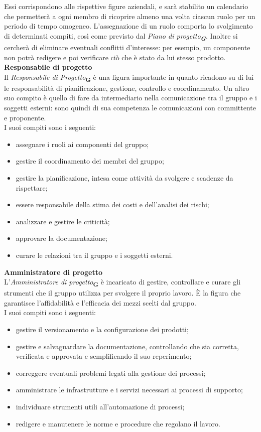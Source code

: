 Essi corrispondono alle rispettive figure aziendali, e sarà stabilito un calendario che permetterà a ogni membro di ricoprire almeno una volta ciascun ruolo per un periodo di tempo omogeneo. L'assegnazione di un ruolo comporta lo svolgimento di determinati compiti, così come previsto dal \textit{Piano di progetto\textsubscript{\textbf{G}}}. Inoltre si cercherà di eliminare eventuali conflitti d'interesse: per esempio, un componente non potrà redigere e poi verificare ciò che è stato da lui stesso prodotto.
\textbf{Responsabile di progetto}\\
Il \textit{Responsabile di Progetto}\textsubscript{\textbf{G}} è una figura importante in quanto ricadono su di lui le responsabilità di pianificazione, gestione, controllo e coordinamento. Un altro suo compito è quello di fare da intermediario nella comunicazione tra il gruppo e i soggetti esterni: sono quindi di sua competenza le comunicazioni con committente e proponente.\\
I suoi compiti sono i seguenti:
\begin{itemize}
    \item assegnare i ruoli ai componenti del gruppo;
    \item gestire il coordinamento dei membri del gruppo;
    \item gestire la pianificazione, intesa come attività da svolgere e scadenze da rispettare;
    \item essere responsabile della stima dei costi e dell’analisi dei rischi;
    \item analizzare e gestire le criticità;
    \item approvare la documentazione;
    \item curare le relazioni tra il gruppo e i soggetti esterni.
\end{itemize}
\textbf{Amministratore di progetto}\\
L’\textit{Amministratore di progetto}\textsubscript{\textbf{G}} è incaricato di gestire, controllare e curare gli strumenti che il gruppo utilizza per svolgere il proprio lavoro. È la figura che garantisce l'affidabilità e l'efficacia dei mezzi scelti dal gruppo.\\
I suoi compiti sono i seguenti:
\begin{itemize}
    \item gestire il versionamento e la configurazione dei prodotti;
    \item gestire e salvaguardare la documentazione, controllando che sia corretta, verificata e approvata e semplificando il suo reperimento;
    \item correggere eventuali problemi legati alla gestione dei processi;
    \item amministrare le infrastrutture e i servizi necessari ai processi di supporto;
    \item individuare strumenti utili all'automazione di processi;
    \item redigere e manutenere le norme e procedure che regolano il lavoro.
\end{itemize}

